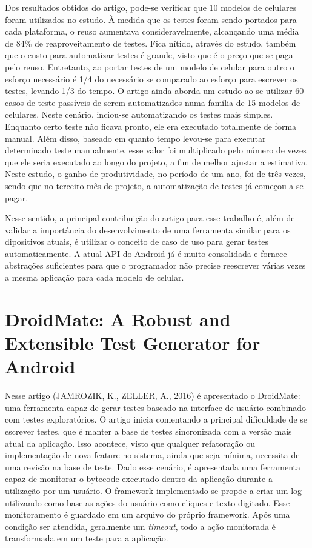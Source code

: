 \documentclass[
    12pt,       %
    openright,      %
    twoside,      %
    a4paper,      %
    english,      %
    french,       %
    spanish,      %
    brazil,       %
    ]{abntex2}
\begin{document}
      Dos resultados obtidos do artigo, pode-se verificar que 10 modelos de celulares foram utilizados no
      estudo. À medida que os testes foram sendo portados para cada plataforma, o reuso aumentava
      consideravelmente, alcançando uma média de 84\% de reaproveitamento de testes. Fica nítido, através
      do estudo, também que o custo para automatizar testes é grande, visto que é o preço que se paga pelo
      reuso. Entretanto, ao portar testes de um modelo de celular para outro o esforço necessário é 1/4 do
      necessário se comparado ao esforço para escrever os testes, levando 1/3 do tempo. O artigo ainda
      aborda um estudo ao se utilizar 60 casos de teste passíveis de serem automatizados numa família de 15
      modelos de celulares. Neste cenário, inciou-se automatizando os testes mais simples. Enquanto certo
      teste não ficava pronto, ele era executado totalmente de forma manual. Além disso, baseado em quanto
      tempo levou-se para executar determinado teste manualmente, esse valor foi multiplicado pelo número de
      vezes que ele seria executado ao longo do projeto, a fim de melhor ajustar a estimativa. Neste estudo,
      o ganho de produtividade, no período de um ano, foi de três vezes, sendo que no terceiro mês de projeto,
      a automatização de testes já começou a se pagar.

      Nesse sentido, a principal contribuição do artigo para esse trabalho é, além de validar a importância
      do desenvolvimento de uma ferramenta similar para os dipositivos atuais, é utilizar o conceito de caso
      de uso para gerar testes automaticamente. A atual API do Android já é muito consolidada e fornece
      abstrações suficientes para que o programador não precise reescrever várias vezes a mesma aplicação
      para cada modelo de celular.

    \section{DroidMate: A Robust and Extensible Test Generator for Android}
      Nesse artigo (JAMROZIK, K., ZELLER, A., 2016) é apresentado o DroidMate: uma ferramenta
      capaz de gerar testes baseado na interface de usuário combinado com testes
      exploratórios. O artigo inicia comentando a principal dificuldade de se escrever
      testes, que é manter a base de testes sincronizada com a versão mais atual da aplicação.
      Isso acontece, visto que qualquer refatoração ou implementação de nova feature no sistema,
      ainda que seja mínima, necessita de uma revisão na base de teste. Dado esse cenário,
      é apresentada uma ferramenta capaz de monitorar o bytecode executado dentro da aplicação
      durante a utilização por um usuário. O framework implementado se propõe a criar
      um log utilizando como base as ações do usuário como cliques e texto
      digitado. Esse monitoramento é guardado em um arquivo do próprio framework. Após
      uma condição ser atendida, geralmente um \textit{timeout}, todo a ação monitorada
      é transformada em um teste para a aplicação.
\end{document}
